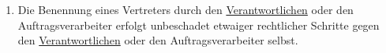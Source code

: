 \begin{enumerate}
  \item Die Benennung eines Vertreters durch den \hyperref[itm:04-7]{Verantwortlichen} oder den Auftragsverarbeiter erfolgt unbeschadet
   etwaiger rechtlicher Schritte gegen den \hyperref[itm:04-7]{Verantwortlichen} oder den Auftragsverarbeiter selbst.
  \label{itm:27-5}

\end{enumerate}


